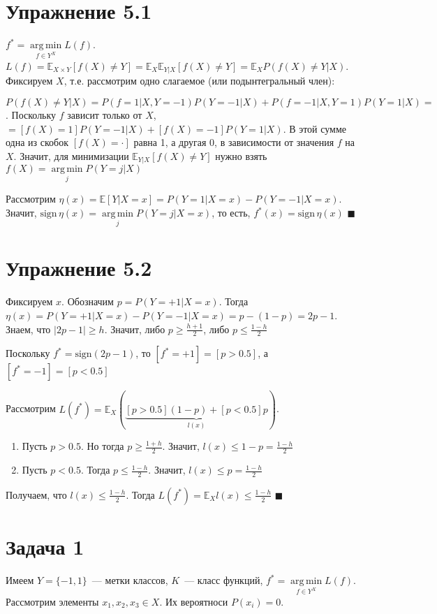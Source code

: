 \documentclass[a4paper]{article}
\DeclareMathOperator*{\argmin}{arg\,min}
\begin{document}
\section*{Упражнение 5.1}
$f^*=\argmin\limits_{f\in Y^X} L(f)$. $L(f)=\mathbb{E}_{X\times Y}[f(X)\neq Y]=\mathbb{E}_X\mathbb{E}_{Y|X}[f(X)\neq Y]=\mathbb{E}_X P(f(X)\neq Y\big| X)$. Фиксируем $X$, т.е. рассмотрим одно слагаемое (или подынтегральный член):

$P(f(X)\neq Y\big|X)=P(f=1\big| X,Y=-1)P(Y=-1\big|X)+P(f=-1\big| X,Y=1)P(Y=1\big|X)\boxed{=}$. Поскольку $f$ зависит только от $X$, $\boxed{=}[f(X)=1]P(Y=-1\big|X)+[f(X)=-1]P(Y=1\big|X)$. В этой сумме одна из скобок $[f(X)=\cdot]$ равна 1, а другая 0, в зависимости от значения $f$ на $X$. Значит, для минимизации $\mathbb{E}_{Y|X}[f(X)\neq Y]$ нужно взять $f(X)=\argmin\limits_j P(Y=j\big|X)$

Рассмотрим $\eta(x)=\mathbb{E}[Y|X=x]=P(Y=1\big|X=x)-P(Y=-1\big| X=x)$. Значит, $\mbox{sign}\,\eta(x)=\argmin\limits_j P(Y=j\big| X=x)$, то есть, $f^*(x)=\mbox{sign}\,\eta(x)$ $\blacksquare$
\section*{Упражнение 5.2}
Фиксируем $x$. Обозначим $p=P(Y=+1|X=x)$. Тогда $\eta(x)=P(Y=+1|X=x)-P(Y=-1|X=x)=p-(1-p)=2p-1$. Знаем, что $|2p-1|\geqslant h$. Значит, либо $p\geqslant\frac{h+1}{2}$, либо $p\leqslant \frac{1-h}{2}$

Поскольку $f^*=\mbox{sign}(2p-1)$, то $[f^*=+1]=[p>0.5]$, а $[f^*=-1]=[p<0.5]$

Рассмотрим $L(f^*)=\mathbb{E}_X\left(\underbrace{[p>0.5](1-p)+[p<0.5]p}_{l(x)}\right)$.

\begin{enumerate}
\item Пусть $p>0.5$. Но тогда $p\geqslant \frac{1+h}{2}$. Значит, $l(x)\leqslant 1-p=\frac{1-h}{2}$
\item Пусть $p<0.5$. Тогда $p\leqslant \frac{1-h}{2}$. Значит, $l(x)\leqslant p=\frac{1-h}{2}$
\end{enumerate}

Получаем, что $l(x)\leqslant \frac{1-h}{2}$. Тогда $L(f^*)=\mathbb{E}_Xl(x)\leqslant \frac{1-h}{2}$ $\blacksquare$
\section*{Задача 1}
Имеем $Y=\{-1,1\}$~--- метки классов, $K$~--- класс функций, $f^*=\argmin\limits_{f\in Y^X} L(f)$. Рассмотрим элементы $x_1,x_2,x_3\in X$. Их вероятноси $P(x_i)=0$.
\end{document}
